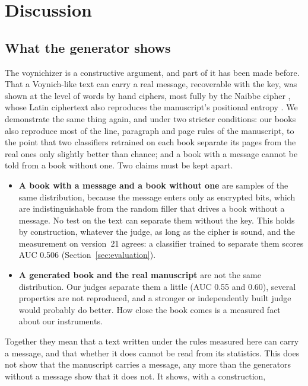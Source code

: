 \section{Discussion}
\label{sec:discussion}

\subsection{What the generator shows}

The voynichizer is a constructive argument, and part of it has been made before. That a Voynich-like text can carry a
real message, recoverable with the key, was shown at the level of words by hand ciphers, most fully by the Naibbe
cipher \citep{greshko2025}, whose Latin ciphertext also reproduces the manuscript's positional entropy
\citep{kinnison2026}. We demonstrate the same thing again, and under two stricter conditions: our books also reproduce
most of the line, paragraph and page rules of the manuscript, to the point that two classifiers retrained on each book
separate its pages from the real ones only slightly better than chance; and a book with a message cannot be told from
a book without one. Two claims must be kept apart.
\begin{itemize}
\item \textbf{A book with a message and a book without one} are samples of the same distribution, because the message
  enters only as encrypted bits, which are indistinguishable from the random filler that drives a book without a message.
  No test on the text can separate them without the key. This holds by construction, whatever the judge, as long as the
  cipher is sound, and the measurement on version~21 agrees: a classifier trained to separate them scores AUC 0.506
  (Section~\ref{sec:evaluation}).
\item \textbf{A generated book and the real manuscript} are not the same distribution. Our judges separate them a
  little (AUC 0.55 and 0.60), several properties are not reproduced, and a stronger or independently built judge would
  probably do better. How close the book comes is a measured fact about our instruments.
\end{itemize}
Together they mean that a text written under the rules measured here can carry a message, and that whether it does
cannot be read from its statistics. This does not show that the manuscript carries a message, any more than the
generators without a message \citep{rugg2004,timmschinner2020} show that it does not. It shows, with a construction,
